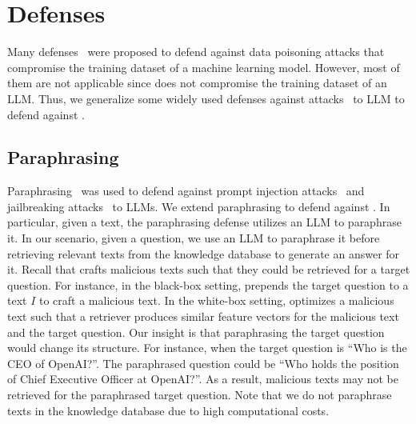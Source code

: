 






\vspace{-3mm}
\section{Defenses}
\vspace{-2mm}
Many defenses~\cite{steinhardt2017certified,wang2019neural,jia2021intrinsic,jia2022certified,jia2023pore,wang2024fcert} were proposed to defend against data poisoning attacks that compromise the training dataset of a machine learning model. However, most of them are not applicable since {\name} does not compromise the training dataset of an LLM. 
Thus, we generalize some widely used defenses against  attacks~\cite{jain2023baseline, alon2023detecting, gonen2022demystifying} to LLM to defend against {\name}.

\vspace{-3mm}
\subsection{Paraphrasing} 
Paraphrasing~\cite{jain2023baseline} was used to defend against prompt injection attacks~\cite{liu2023prompt, liuyi2023prompt, pedro2023prompt, branch2022evaluating} and jailbreaking attacks~\cite{wei2023jailbroken, zou2023universal, deng2023jailbreaker, qi2023visual, li2023multistep, shen2023do} to LLMs. We extend paraphrasing to defend against {\name}. In particular, given a text, the paraphrasing defense utilizes an LLM to paraphrase it. In our scenario, given a question, we use an LLM to paraphrase it before retrieving relevant texts from the knowledge database to generate an answer for it. Recall that {\name} crafts malicious texts such that they could be retrieved for a target question. For instance, in the black-box setting, {\name} prepends the target question to a text $I$ to craft a malicious text. In the white-box setting, {\name} optimizes a malicious text such that a retriever produces similar feature vectors for the malicious text and the target question. Our insight is that paraphrasing the target question would change its structure. For instance, when the target question is ``Who is the CEO of OpenAI?''. The paraphrased question could be ``Who holds the position of Chief Executive Officer at OpenAI?''. As a result, malicious texts may not be retrieved for the paraphrased target question. Note that we do not paraphrase texts in the knowledge database  
due to high computational costs.


